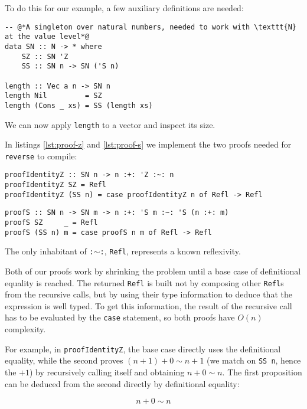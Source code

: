 To do this for our example, a few auxiliary definitions are needed:

\begin{lstlisting}[caption=Bringing \texttt{N} to the value level]
-- @*A singleton over natural numbers, needed to work with \texttt{N} at the value level*@
data SN :: N -> * where
    SZ :: SN 'Z
    SS :: SN n -> SN ('S n)

length :: Vec a n -> SN n
length Nil         = SZ
length (Cons _ xs) = SS (length xs)
\end{lstlisting}

We can now apply \texttt{length} to a vector and inspect its size.

In listings \ref{lst:proof-z} and \ref{lst:proof-s} we implement the two proofs needed for \texttt{reverse} to compile:

\begin{lstlisting}[caption=A proof that \texttt{'Z} is the right identity element in type-level addition, label=lst:proof-z]
proofIdentityZ :: SN n -> n :+: 'Z :~: n
proofIdentityZ SZ = Refl
proofIdentityZ (SS n) = case proofIdentityZ n of Refl -> Refl
\end{lstlisting}

\begin{lstlisting}[caption=A proof that $n+(m+1) \sim (n+m)+1$, label=lst:proof-s]
proofS :: SN n -> SN m -> n :+: 'S m :~: 'S (n :+: m)
proofS SZ     _ = Refl
proofS (SS n) m = case proofS n m of Refl -> Refl
\end{lstlisting}

The only inhabitant of \texttt{:$\sim$:}, \texttt{Refl}, represents a known reflexivity.

Both of our proofs work by shrinking the problem until a base case of definitional equality is reached.
The returned \texttt{Refl} is built not by composing other \texttt{Refl}s from the recursive calls, but by using their type information to deduce that the expression is well typed.
To get this information, the result of the recursive call has to be evaluated by the \texttt{case} statement, so both proofs have $O(n)$ complexity.

For example, in \texttt{proofIdentityZ}, the base case directly uses the definitional equality, while the second proves $(n+1) + 0 \sim n+1$ (we match on \texttt{SS n}, hence the $+1$) by recursively calling itself and obtaining $n+0 \sim n$.
The first proposition can be deduced from the second directly by definitional equality:

$$
n+0 \sim n
$$

